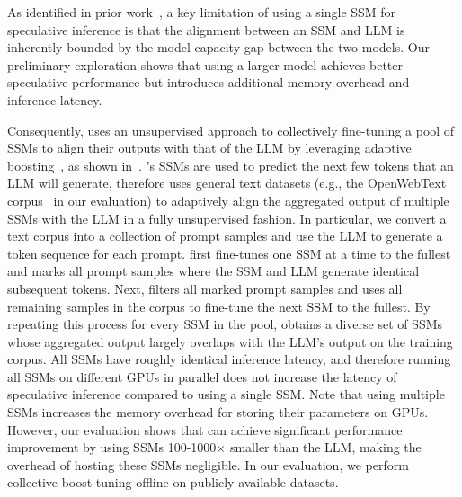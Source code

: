 

As identified in prior work~\cite{leviathan2022fast, stern2018blockwise},
a key limitation of using a single SSM for speculative inference is that the alignment between an SSM and LLM is inherently bounded by the model capacity gap between the two models.
Our preliminary exploration shows that using a larger model achieves better speculative performance but introduces additional memory overhead and inference latency.

Consequently, \Sys uses an unsupervised approach to collectively fine-tuning a pool of SSMs to align their outputs with that of the LLM by leveraging adaptive boosting~\cite{freund1999short}, as shown in~.
\Sys's SSMs are used to predict the next few tokens that an LLM will generate, therefore \Sys uses general text datasets (e.g., the OpenWebText corpus~\cite{Gokaslan2019OpenWeb} in our evaluation) to adaptively align the aggregated output of multiple SSMs with the LLM in a fully unsupervised fashion.
In particular, we convert a text corpus into a collection of prompt samples and use the LLM to generate a token sequence for each prompt. 
\Sys first fine-tunes one SSM at a time to the fullest and marks all prompt samples where the SSM and LLM generate identical subsequent tokens.
Next, \Sys filters all marked prompt samples and uses all remaining samples in the corpus to fine-tune the next SSM to the fullest. 
By repeating this process for every SSM in the pool, \Sys obtains a diverse set of SSMs whose aggregated output largely overlaps with the LLM's output on the training corpus.
All SSMs have roughly identical inference latency, and therefore running all SSMs on different GPUs in parallel does not increase the latency of speculative inference compared to using a single SSM. 
Note that using multiple SSMs increases the memory overhead for storing their parameters on GPUs. However, our evaluation shows that \Sys can achieve significant performance improvement by using SSMs 100-1000$\times$ smaller than the LLM, making the overhead of hosting these SSMs negligible.
In our evaluation, we perform collective boost-tuning offline on publicly available datasets.
\fi 

